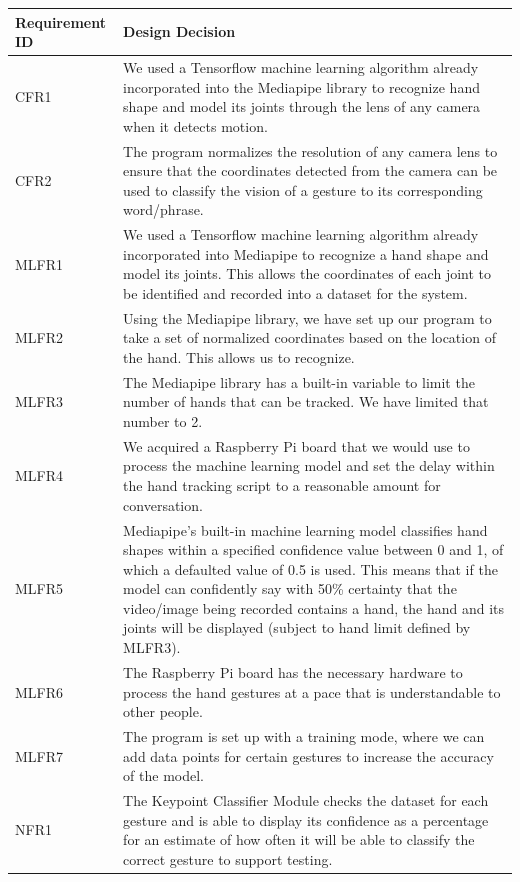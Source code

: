 \documentclass[12pt, titlepage]{article}
\begin{document}
\renewcommand{\arraystretch}{1.2}
\noindent \begin{longtable}{p{}|p{}}
\hline
\textbf{Requirement ID} & \textbf{Design Decision}\\
\hline
CFR1
& We used a Tensorflow machine learning algorithm already incorporated into the Mediapipe library to recognize hand shape and model its joints through the lens of any camera when it detects motion.\\
\hline
CFR2
& The program normalizes the resolution of any camera lens to ensure that the coordinates detected from the camera can be used to classify the vision of a gesture to its corresponding word/phrase.\\
\hline
MLFR1
& We used a Tensorflow machine learning algorithm already incorporated into Mediapipe to recognize a hand shape and model its joints. This allows the coordinates of each joint to be identified and recorded into a dataset for the system.\\
\hline
MLFR2
& Using the Mediapipe library, we have set up our program to take a set of normalized coordinates based on the location of the hand. This allows us to recognize.\\
\hline
MLFR3
& The Mediapipe library has a built-in variable to limit the number of hands that can be tracked. We have limited that number to 2.\\
\hline
MLFR4
& We acquired a Raspberry Pi board that we would use to process the machine learning model and set the delay within the hand tracking script to a reasonable amount for conversation.\\
\hline
MLFR5
& Mediapipe’s built-in machine learning model classifies hand shapes within a specified confidence value between 0 and 1, of which a defaulted value of 0.5 is used. This means that if the model can confidently say with 50\% certainty that the video/image being recorded contains a hand, the hand and its joints will be displayed (subject to hand limit defined by MLFR3).\\
\hline
MLFR6
& The Raspberry Pi board has the necessary hardware to process the hand gestures at a pace that is understandable to other people.\\
\hline
MLFR7
& The program is set up with a training mode, where we can add data points for certain gestures to increase the accuracy of the model.\\
\hline
NFR1
& The Keypoint Classifier Module checks the dataset for each gesture and is able to display its confidence as a percentage for an estimate of how often it will be able to classify the correct gesture to support testing.\\

\end{longtable}
\end{document}
